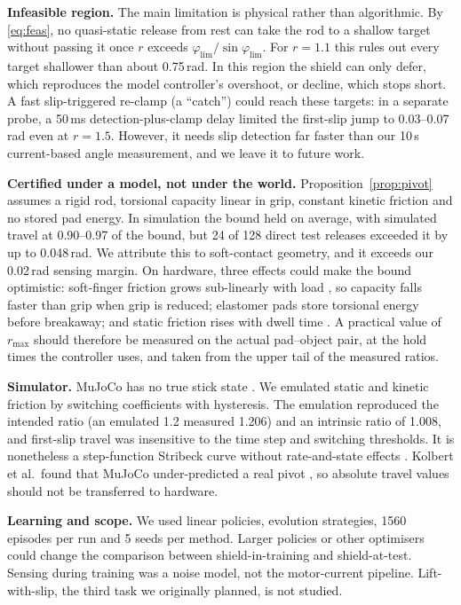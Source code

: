 \textbf{Infeasible region.} The main limitation is physical rather than algorithmic. By \eqref{eq:feas}, no quasi-static release from rest can take the rod to a shallow target without passing it once $r$ exceeds $\varphi_{\lim}/\sin\varphi_{\lim}$. For $r=1.1$ this rules out every target shallower than about 0.75\,rad. In this region the shield can only defer, which reproduces the model controller's overshoot, or decline, which stops short. A fast slip-triggered re-clamp (a ``catch'') could reach these targets: in a separate probe, a 50\,ms detection-plus-clamp delay limited the first-slip jump to 0.03--0.07\,rad even at $r=1.5$. However, it needs slip detection far faster than our 10\,s current-based angle measurement, and we leave it to future work.

\textbf{Certified under a model, not under the world.} Proposition~\ref{prop:pivot} assumes a rigid rod, torsional capacity linear in grip, constant kinetic friction and no stored pad energy. In simulation the bound held on average, with simulated travel at 0.90--0.97 of the bound, but 24 of 128 direct test releases exceeded it by up to 0.048\,rad. We attribute this to soft-contact geometry, and it exceeds our 0.02\,rad sensing margin. On hardware, three effects could make the bound optimistic: soft-finger friction grows sub-linearly with load \cite{xydas1999}, so capacity falls faster than grip when grip is reduced; elastomer pads store torsional energy before breakaway; and static friction rises with dwell time \cite{dieterich1972}. A practical value of $r_{\max}$ should therefore be measured on the actual pad--object pair, at the hold times the controller uses, and taken from the upper tail of the measured ratios.

\textbf{Simulator.} MuJoCo has no true stick state \cite{mujocoissue}. We emulated static and kinetic friction by switching coefficients with hysteresis. The emulation reproduced the intended ratio (an emulated 1.2 measured 1.206) and an intrinsic ratio of 1.008, and first-slip travel was insensitive to the time step and switching thresholds. It is nonetheless a step-function Stribeck curve without rate-and-state effects \cite{canudas1995}. Kolbert et al.\ found that MuJoCo under-predicted a real pivot \cite{kolbert2016}, so absolute travel values should not be transferred to hardware.

\textbf{Learning and scope.} We used linear policies, evolution strategies, 1560 episodes per run and 5 seeds per method. Larger policies or other optimisers could change the comparison between shield-in-training and shield-at-test. Sensing during training was a noise model, not the motor-current pipeline. Lift-with-slip, the third task we originally planned, is not studied.
